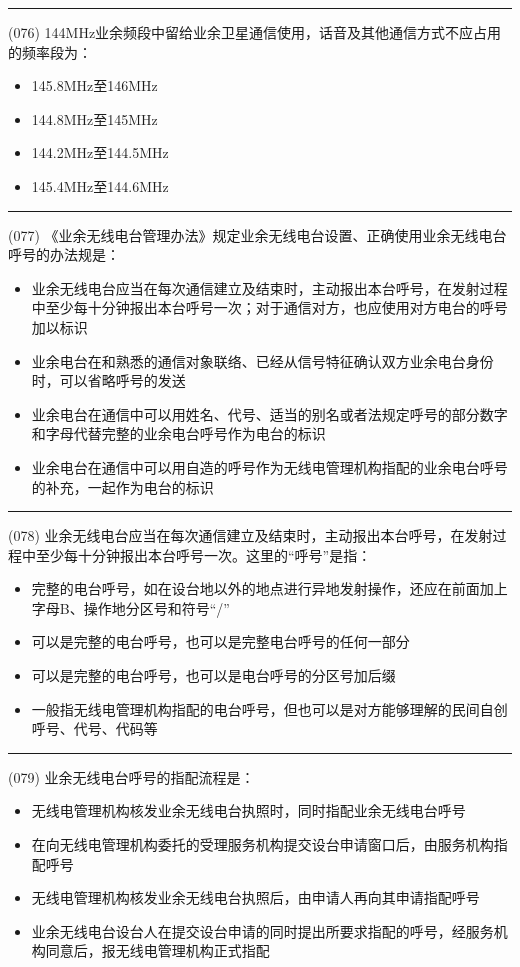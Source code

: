 \documentclass[twocolumn]{ctexart}  %
\begin{document}
\noindent\rule{0.5\textwidth}{1pt}
\heiti (076) 144MHz业余频段中留给业余卫星通信使用，话音及其他通信方式不应占用的频率段为： \songti {\color{gray} [LK1032] }
\begin{itemize}
	\item  145.8MHz至146MHz
	\item  144.8MHz至145MHz
	\item  144.2MHz至144.5MHz
	\item  145.4MHz至144.6MHz
\end{itemize}


\noindent\rule{0.5\textwidth}{1pt}
\heiti (077) 《业余无线电台管理办法》规定业余无线电台设置、正确使用业余无线电台呼号的办法规是： \songti {\color{gray} [LK0077] }
\begin{itemize}
	\item  业余无线电台应当在每次通信建立及结束时，主动报出本台呼号，在发射过程中至少每十分钟报出本台呼号一次；对于通信对方，也应使用对方电台的呼号加以标识
	\item  业余电台在和熟悉的通信对象联络、已经从信号特征确认双方业余电台身份时，可以省略呼号的发送
	\item  业余电台在通信中可以用姓名、代号、适当的别名或者法规定呼号的部分数字和字母代替完整的业余电台呼号作为电台的标识
	\item  业余电台在通信中可以用自造的呼号作为无线电管理机构指配的业余电台呼号的补充，一起作为电台的标识
\end{itemize}


\noindent\rule{0.5\textwidth}{1pt}
\heiti (078) 业余无线电台应当在每次通信建立及结束时，主动报出本台呼号，在发射过程中至少每十分钟报出本台呼号一次。这里的“呼号”是指： \songti {\color{gray} [LK0078] }
\begin{itemize}
	\item  完整的电台呼号，如在设台地以外的地点进行异地发射操作，还应在前面加上字母B、操作地分区号和符号“/”
	\item  可以是完整的电台呼号，也可以是完整电台呼号的任何一部分
	\item  可以是完整的电台呼号，也可以是电台呼号的分区号加后缀
	\item  一般指无线电管理机构指配的电台呼号，但也可以是对方能够理解的民间自创呼号、代号、代码等
\end{itemize}


\noindent\rule{0.5\textwidth}{1pt}
\heiti (079) 业余无线电台呼号的指配流程是： \songti {\color{gray} [LK0080] }
\begin{itemize}
	\item  无线电管理机构核发业余无线电台执照时，同时指配业余无线电台呼号
	\item  在向无线电管理机构委托的受理服务机构提交设台申请窗口后，由服务机构指配呼号
	\item  无线电管理机构核发业余无线电台执照后，由申请人再向其申请指配呼号
	\item  业余无线电台设台人在提交设台申请的同时提出所要求指配的呼号，经服务机构同意后，报无线电管理机构正式指配
\end{itemize}
\end{document}
